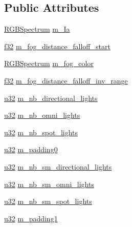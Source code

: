 \subsection*{Public Attributes}
\begin{DoxyCompactItemize}
\item 
\hyperlink{structmage_1_1_r_g_b_spectrum}{R\+G\+B\+Spectrum} \hyperlink{structmage_1_1_light_buffer_a1053a31ecdfdec2d4703376152f6defc}{m\+\_\+\+Ia}
\item 
\hyperlink{namespacemage_a6a44ad388483959dc4dff9f2aef91431}{f32} \hyperlink{structmage_1_1_light_buffer_ae712ae6ca445249590444e6d05c76de0}{m\+\_\+fog\+\_\+distance\+\_\+falloff\+\_\+start}
\item 
\hyperlink{structmage_1_1_r_g_b_spectrum}{R\+G\+B\+Spectrum} \hyperlink{structmage_1_1_light_buffer_aa33b98b2880c519eb5be09f78ce4581e}{m\+\_\+fog\+\_\+color}
\item 
\hyperlink{namespacemage_a6a44ad388483959dc4dff9f2aef91431}{f32} \hyperlink{structmage_1_1_light_buffer_a46e293e4883664c85cf4597b5d2736fc}{m\+\_\+fog\+\_\+distance\+\_\+falloff\+\_\+inv\+\_\+range}
\item 
\hyperlink{namespacemage_af2b398bf98eb10351f49cad73fe2cc73}{u32} \hyperlink{structmage_1_1_light_buffer_a829e23ebcbddde6207237d85cf73592c}{m\+\_\+nb\+\_\+directional\+\_\+lights}
\item 
\hyperlink{namespacemage_af2b398bf98eb10351f49cad73fe2cc73}{u32} \hyperlink{structmage_1_1_light_buffer_af035d6a6ce21f6f307972c7d97ed11a2}{m\+\_\+nb\+\_\+omni\+\_\+lights}
\item 
\hyperlink{namespacemage_af2b398bf98eb10351f49cad73fe2cc73}{u32} \hyperlink{structmage_1_1_light_buffer_a5061a754278a9dfd49480a72f17eb1a0}{m\+\_\+nb\+\_\+spot\+\_\+lights}
\item 
\hyperlink{namespacemage_af2b398bf98eb10351f49cad73fe2cc73}{u32} \hyperlink{structmage_1_1_light_buffer_ab5cdd2009e930895f316a348102663b5}{m\+\_\+padding0}
\item 
\hyperlink{namespacemage_af2b398bf98eb10351f49cad73fe2cc73}{u32} \hyperlink{structmage_1_1_light_buffer_a5c4f2c1f5f67be5bd31237ea7327d2dd}{m\+\_\+nb\+\_\+sm\+\_\+directional\+\_\+lights}
\item 
\hyperlink{namespacemage_af2b398bf98eb10351f49cad73fe2cc73}{u32} \hyperlink{structmage_1_1_light_buffer_a4330db1d8eb37fc18ee55acd33b67d31}{m\+\_\+nb\+\_\+sm\+\_\+omni\+\_\+lights}
\item 
\hyperlink{namespacemage_af2b398bf98eb10351f49cad73fe2cc73}{u32} \hyperlink{structmage_1_1_light_buffer_a22e862f69f1d56aad87614bc0ad2690b}{m\+\_\+nb\+\_\+sm\+\_\+spot\+\_\+lights}
\item 
\hyperlink{namespacemage_af2b398bf98eb10351f49cad73fe2cc73}{u32} \hyperlink{structmage_1_1_light_buffer_a34cbefbfe7822c094ba2a2800c1b93bf}{m\+\_\+padding1}
\end{DoxyCompactItemize}
